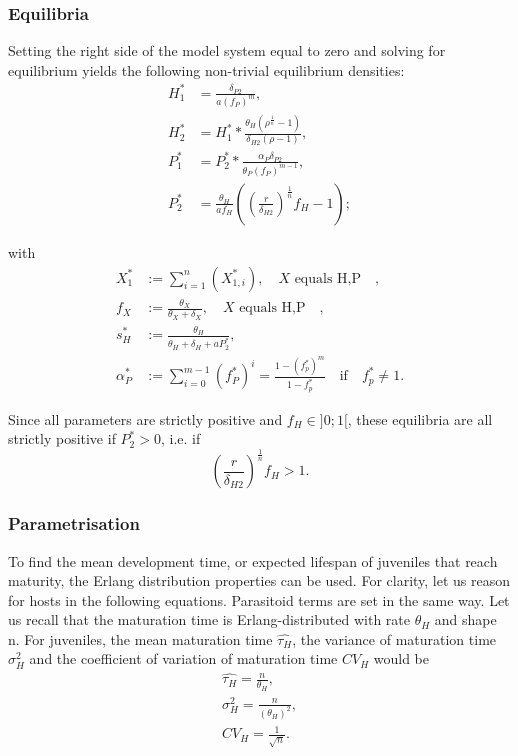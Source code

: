 \documentclass[12pt,a4paper,onecolumn]{article}
\begin{document}
\subsubsection{Equilibria}

Setting the right side of the model system equal to zero and solving for equilibrium yields the following non-trivial equilibrium densities:
\begin{align}
H_1^* &= \frac{\delta_{P2}}{a(f_P)^m}, \nonumber \\
H_2^* &= H_1^* * \frac{\theta_{H} (\rho^{\frac{1}{n}}-1)}{\delta_{H2} (\rho-1)}, \nonumber \\
P_1^* &= P_2^* * \frac{\alpha_P \delta_{P2}}{\theta_P (f_P)^{m-1}},  \\
P_2^*&= \frac{\theta_H}{a f_H} ((\frac{r}{\delta_{H2}})^{\frac{1}{n}}f_H -1); \nonumber
\end{align}

with 
\begin{align}
X_1^* &:= \sum_{i=1}^{n} (X_{1,i}^*), \quad \text{$X$ equals H,P} \quad ,  \nonumber  \\
f_X &:= \frac{\theta_X}{\theta_X + \delta_X}, \quad \text{$X$ equals H,P} \quad , \nonumber \\
s_H^* &:= \frac{\theta_H}{\theta_H + \delta_H + aP_2^*},  \\
\alpha_P^* &:= \sum_{i=0}^{m-1} (f_P^*)^i = \frac{1-(f_p^*)^m}{1-f_p^*} \quad \text{if} \quad f_p^* \neq 1 . \nonumber
\end{align}

Since all parameters are strictly positive and $f_H \in ]0;1[$, these equilibria are all strictly positive if $P_2^* > 0$, i.e. if
\begin{equation}
(\frac{r}{\delta_{H2}})^{\frac{1}{n}} f_H  > 1.
\end{equation}

\subsubsection{Parametrisation}
To find the mean development time, or expected lifespan of juveniles that reach maturity, the Erlang distribution properties can be used.
For clarity, let us reason for hosts in the following equations. Parasitoid terms are set in the same way.  Let us recall that the maturation time is Erlang-distributed with rate $\theta_H$ and shape n. For juveniles, the mean maturation time $\hat{\tau_{H}}$, the variance of maturation time $\sigma^2_{H}$ and the coefficient of variation of maturation time $CV_{H}$ would be 
\begin{align}
\hat{\tau_{H}} = \frac{n}{\theta_{H}}, \nonumber \\
\sigma^2_{H} = \frac{n}{(\theta_{H})^2}, \\
CV_{H} = \frac{1}{\sqrt{n}}. \nonumber 
\end{align}
\end{document}
